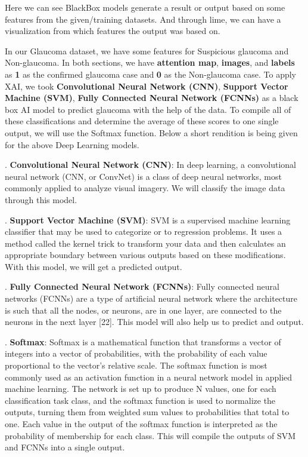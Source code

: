 \vspace{5mm}
\noindent Here we can see BlackBox models generate a result or output based on some features from the given/training datasets. And through lime, we can have a visualization from which features the output was based on.

\vspace{5mm}
\noindent In our Glaucoma dataset, we have some features for Suspicious glaucoma and Non-glaucoma. In both sections, we have \textbf{attention map}, \textbf{images}, and \textbf{labels} as \textbf{1} as the confirmed glaucoma case and \textbf{0} as the Non-glaucoma case. To apply XAI, we took \textbf{Convolutional Neural Network (CNN)}, \textbf{Support Vector Machine (SVM)}, \textbf{Fully Connected Neural Network (FCNNs)} as a black box AI model to predict glaucoma with the help of the data. To compile all of these classifications and determine the average of these scores to one single output, we will use the Softmax function. Below a short rendition is being given for the above Deep Learning models.

\vspace{5mm}
.    \textbf{Convolutional Neural Network (CNN)}: In deep learning, a convolutional neural network (CNN, or ConvNet) is a class of deep neural networks, most commonly applied to analyze visual imagery. We will classify the image data through this model.

\vspace{5mm}
.    \textbf{Support Vector Machine (SVM)}: SVM is a supervised machine learning classifier that may be used to categorize or to regression problems.
It uses a method called the kernel trick to transform your data and then calculates an appropriate boundary between various outputs based on these modifications. With this model, we will get a predicted output.

\vspace{5mm}
.    \textbf{Fully Connected Neural Network (FCNNs)}: Fully connected neural networks (FCNNs) are a type of artificial neural network where the architecture is such that all the nodes, or neurons, are in one layer, are connected to the neurons in the next layer [22]. This model will also help us to predict and output.

\vspace{5mm}
.    \textbf{Softmax}: Softmax is a mathematical function that transforms a vector of integers into a vector of probabilities, with the probability of each value proportional to the vector's relative scale. The softmax function is most commonly used as an activation function in a neural network model in applied machine learning. The network is set up to produce N values, one for each classification task class, and the softmax function is used to normalize the outputs, turning them from weighted sum values to probabilities that total to one. Each value in the output of the softmax function is interpreted as the probability of membership for each class. This will compile the outputs of SVM and FCNNs into a single output.

